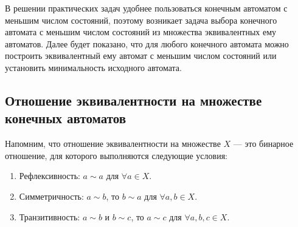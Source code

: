 В решении практических задач удобнее пользоваться конечным автоматом с меньшим числом состояний, поэтому возникает задача выбора конечного автомата с меньшим числом состояний из множества эквивалентных ему автоматов. Далее будет показано, что для любого конечного автомата можно построить эквивалентный ему автомат с меньшим числом состояний или установить минимальность исходного автомата.

\subsection*{Отношение эквивалентности на множестве конечных автоматов}

Напомним, что отношение эквивалентности на множестве $X$ --- это бинарное отношение, для которого выполняются следующие условия:
\begin{enumerate}
\item Рефлексивность: $a \sim a$ для $\forall a \in X$.
\item Симметричность: $a \sim b$, то $b \sim a$ для $\forall a, b \in X$.
\item Транзитивность: $a \sim b$ и $b \sim c$, то $a \sim c$ для $\forall a, b, c \in X$.
\end{enumerate}

